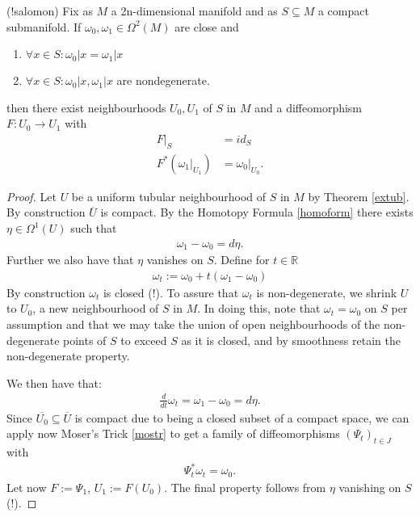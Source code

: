 \begin{theorem}\label{mosiso}
(!salomon)
Fix as $M$ a 2n-dimensional manifold and as $S \subseteq M$ a compact submanifold. If $\omega_0 , \omega_1 \in \Omega^2(M)$ are close and
\begin{enumerate}
\item $\forall x \in S: \omega_0|x = \omega_1|x$
\item $\forall x \in S: \omega_0|x, \omega_1|x$ are nondegenerate.
\end{enumerate}
then there exist neighbourhoods $U_0,U_1$ of $S$ in $M$ and a diffeomorphism $F: U_0 \to U_1$ with
\begin{align*}
F|_S &= id_S \\
F^*(\omega_1|_{U_1}) &= \omega_0|_{U_0}.
\end{align*}
\end{theorem}

\begin{proof}
Let $U$ be a uniform tubular neighbourhood of $S$ in $M$ by Theorem \ref{extub}. By construction $\overline{U}$ is compact. By the Homotopy Formula \ref{homoform} there exists $\eta \in \Omega^{1}(U)$ such that
\begin{align*}
\omega_1 - \omega_0 = d\eta.
\end{align*}
Further we also have that $\eta$ vanishes on $S$.
Define for $t \in \mathbb{R}$
\begin{align*}
\omega_t := \omega_0 + t(\omega_1 - \omega_0)
\end{align*}
By construction $\omega_t$ is closed (!). To assure that $\omega_t$ is non-degenerate, we shrink $U$ to $U_0$, a new neighbourhood of $S$ in $M$. In doing this, note that $\omega_t = \omega_0$ on $S$ per assumption and that we may take the union of open neighbourhoods of the non-degenerate points of $S$ to exceed $S$ as it is closed, and by smoothness retain the non-degenerate property.

We then have that:
\begin{align*}
\frac{d}{dt} \omega_t = \omega_1 - \omega_0 = d\eta .
\end{align*}
Since $\overline{U_0} \subseteq \overline{U}$ is compact due to being a closed subset of a compact space, we can apply now Moser's Trick \ref{mostr} to get a family of diffeomorphisms $(\Psi_t)_{t \in J}$ with
\begin{align*}
\Psi^*_t \omega_t = \omega_0.
\end{align*}
Let now $F := \Psi_1$, $U_1 := F(U_0)$. The final property follows from $\eta$ vanishing on $S$ (!).
\end{proof}

